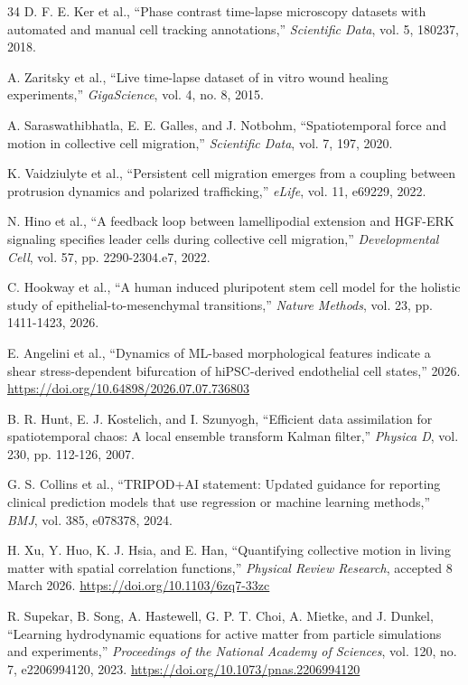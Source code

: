 \documentclass[11pt,a4paper]{article}
\begin{document}
\begin{thebibliography}{34}
 D. F. E. Ker et al., “Phase contrast time-lapse microscopy datasets with automated and manual cell tracking annotations,” \textit{Scientific Data}, vol. 5, 180237, 2018.

 A. Zaritsky et al., “Live time-lapse dataset of in vitro wound healing experiments,” \textit{GigaScience}, vol. 4, no. 8, 2015.

 A. Saraswathibhatla, E. E. Galles, and J. Notbohm, “Spatiotemporal force and motion in collective cell migration,” \textit{Scientific Data}, vol. 7, 197, 2020.

 K. Vaidziulyte et al., “Persistent cell migration emerges from a coupling between protrusion dynamics and polarized trafficking,” \textit{eLife}, vol. 11, e69229, 2022.

 N. Hino et al., “A feedback loop between lamellipodial extension and HGF-ERK signaling specifies leader cells during collective cell migration,” \textit{Developmental Cell}, vol. 57, pp. 2290-2304.e7, 2022.

 C. Hookway et al., “A human induced pluripotent stem cell model for the holistic study of epithelial-to-mesenchymal transitions,” \textit{Nature Methods}, vol. 23, pp. 1411-1423, 2026.

 E. Angelini et al., “Dynamics of ML-based morphological features indicate a shear stress-dependent bifurcation of hiPSC-derived endothelial cell states,” 2026. \url{https://doi.org/10.64898/2026.07.07.736803}

 B. R. Hunt, E. J. Kostelich, and I. Szunyogh, “Efficient data assimilation for spatiotemporal chaos: A local ensemble transform Kalman filter,” \textit{Physica D}, vol. 230, pp. 112-126, 2007.

 G. S. Collins et al., “TRIPOD+AI statement: Updated guidance for reporting clinical prediction models that use regression or machine learning methods,” \textit{BMJ}, vol. 385, e078378, 2024.

 H. Xu, Y. Huo, K. J. Hsia, and E. Han, “Quantifying collective motion in living matter with spatial correlation functions,” \textit{Physical Review Research}, accepted 8 March 2026. \url{https://doi.org/10.1103/6zq7-33zc}

 R. Supekar, B. Song, A. Hastewell, G. P. T. Choi, A. Mietke, and J. Dunkel, “Learning hydrodynamic equations for active matter from particle simulations and experiments,” \textit{Proceedings of the National Academy of Sciences}, vol. 120, no. 7, e2206994120, 2023. \url{https://doi.org/10.1073/pnas.2206994120}


\end{thebibliography}
\end{document}
